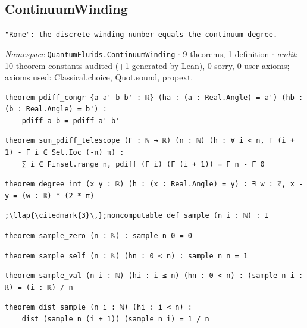 \subsection{ContinuumWinding}\label{appA:ContinuumWinding}
{\footnotesize\raggedright\texttt{"Rome": the discrete winding number equals the continuum degree.\allowbreak{}}\par}
{\footnotesize\raggedright\emph{Namespace} \texttt{QuantumFluids.\allowbreak{}ContinuumWinding} $\cdot$ 9 theorems, 1 definition $\cdot$ \emph{audit}: 10 theorem constants audited (+1 generated by Lean), 0 sorry, 0 user axioms; axioms used: Classical.choice, Quot.sound, propext.\par}
\vspace{1pt}
\begin{lstlisting}[style=leancat]
theorem pdiff_congr {a a' b b' : ℝ} (ha : (a : Real.Angle) = a') (hb : (b : Real.Angle) = b') :
    pdiff a b = pdiff a' b'
\end{lstlisting}

\begin{lstlisting}[style=leancat]
theorem sum_pdiff_telescope (Γ : ℕ → ℝ) (n : ℕ) (h : ∀ i < n, Γ (i + 1) - Γ i ∈ Set.Ioc (-π) π) :
    ∑ i ∈ Finset.range n, pdiff (Γ i) (Γ (i + 1)) = Γ n - Γ 0
\end{lstlisting}

\begin{lstlisting}[style=leancat]
theorem degree_int (x y : ℝ) (h : (x : Real.Angle) = y) : ∃ w : ℤ, x - y = (w : ℝ) * (2 * π)
\end{lstlisting}

\begin{lstlisting}[style=leancat]
;\llap{\citedmark{3}\,};noncomputable def sample (n i : ℕ) : I
\end{lstlisting}

\begin{lstlisting}[style=leancat]
theorem sample_zero (n : ℕ) : sample n 0 = 0
\end{lstlisting}

\begin{lstlisting}[style=leancat]
theorem sample_self (n : ℕ) (hn : 0 < n) : sample n n = 1
\end{lstlisting}

\begin{lstlisting}[style=leancat]
theorem sample_val (n i : ℕ) (hi : i ≤ n) (hn : 0 < n) : (sample n i : ℝ) = (i : ℝ) / n
\end{lstlisting}

\begin{lstlisting}[style=leancat]
theorem dist_sample (n i : ℕ) (hi : i < n) :
    dist (sample n (i + 1)) (sample n i) = 1 / n
\end{lstlisting}

